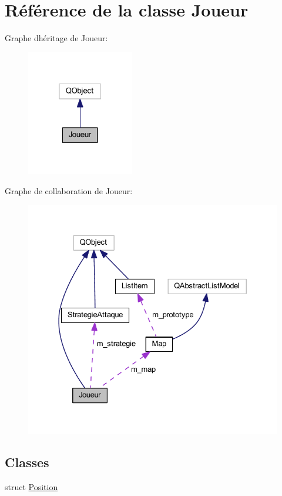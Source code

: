 \hypertarget{class_joueur}{}\section{Référence de la classe Joueur}
\label{class_joueur}


Graphe d\textquotesingle{}héritage de Joueur\+:
\nopagebreak
\begin{figure}[H]
\begin{center}
\leavevmode
\includegraphics[width=133pt]{class_joueur__inherit__graph}
\end{center}
\end{figure}


Graphe de collaboration de Joueur\+:
\nopagebreak
\begin{figure}[H]
\begin{center}
\leavevmode
\includegraphics[width=327pt]{class_joueur__coll__graph}
\end{center}
\end{figure}
\subsection*{Classes}
\begin{DoxyCompactItemize}
\item 
struct \hyperlink{struct_joueur_1_1_position}{Position}
\end{DoxyCompactItemize}
